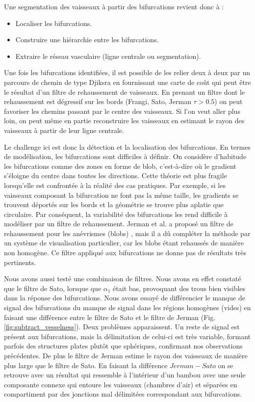 Une segmentation des vaisseaux à partir des bifurcations revient donc à :

\begin{itemize}
\item Localiser les bifurcations.
\item Construire une hiérarchie entre les bifurcations.
\item Extraire le réseau vasculaire (ligne centrale ou segmentation).
\end{itemize}

Une fois les bifurcations identifiées, il est possible de les relier deux à deux par un parcours de chemin de type Djiksra en fournissant une carte de coût qui peut être le résultat d'un filtre de rehaussement de vaisseaux. En prenant un filtre dont le rehaussement est dégressif sur les bords (Frangi, Sato, Jerman $\tau > 0.5$) on peut favoriser les chemins passant par le centre des vaisseaux. Si l'on veut aller plus loin, on peut même en partie reconstruire les vaisseaux en estimant le rayon des vaisseaux à partir de leur ligne centrale.

Le challenge ici est donc la détection et la localisation des bifurcations. En termes de modélisation, les bifurcations sont difficiles à définir. On considère d'habitude les bifurcations comme des zones en forme de blob, c'est-à-dire où le gradient s'éloigne du centre dans toutes les directions. Cette théorie est plus fragile lorsqu'elle est confrontée à la réalité des cas pratiques. Par exemple, si les vaisseaux composant la bifurcation ne font pas la même taille, les gradients se trouvent déportés sur les bords et la géométrie se trouve plus aplatie que circulaire. Par conséquent, la variabilité des bifurcations les rend difficile à modéliser par un filtre de rehaussement. Jerman et al. a proposé un filtre de rehaussement pour les anévrismes (blobs) \cite{Jerman2015_blobness}, mais il a dû compléter la méthode par un système de visualisation particulier, car les blobs étant rehaussés de manière non homogène. Ce filtre appliqué aux bifurcations ne donne pas de résultats très pertinents.

Nous avons aussi testé une combinaison de filtres. Nous avons en effet constaté que le filtre de Sato, lorsque que $\alpha_1$ était bas, provoquant des trous bien visibles dans la réponse des bifurcations. Nous avons essayé de différencier le manque de signal des bifurcations du manque de signal dans les régions homogènes (vides) en faisant une différence entre le filtre de Sato et le filtre de Jerman (Fig. \ref{fig:subtract_vesselness}). Deux problèmes apparaissent. Un reste de signal est présent aux bifurcations, mais la délimitation de celui-ci est très variable, formant parfois des structures plates plutôt que sphériques, confirmant nos observations précédentes. De plus le filtre de Jerman estime le rayon des vaisseaux de manière plus large que le filtre de Sato. En faisant la différence $Jerman-Sato$ on se retrouve avec un résultat qui ressemble à l'intérieur d'un bambou avec une seule composante connexe qui entoure les vaisseaux (chambres d'air) et séparées en compartiment par des jonctions mal délimitées correspondant aux bifurcations.

